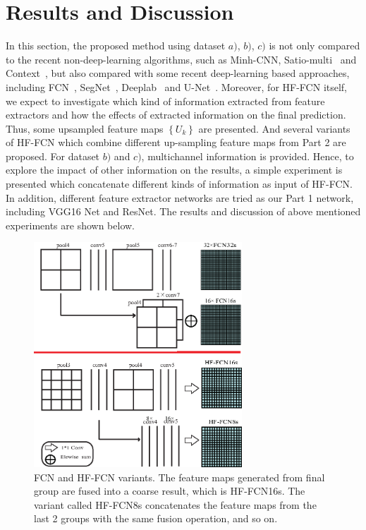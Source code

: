 \section{Results and Discussion}
\label{Sec:Res}

In this section, the proposed method using dataset ${a)}$, ${b)}$, ${c)}$ is not only compared to the recent non-deep-learning algorithms, such as Minh-CNN\cite{IEEEexample:mnih2013machine}, Satio-multi~\cite{IEEEexample:saito2016multiple} and Context~\cite{IEEEexample:audebert2017deep}, but also compared with some recent deep-learning based approaches, including FCN~\cite{IEEEexample:Long_2015_CVPR}, SegNet~\cite{IEEEexample:badrinarayanan2017segnet}, Deeplab~\cite{IEEEexample:chen2016deeplab} and U-Net~\cite{IEEEexample:ronneberger2015u}.
Moreover, for HF-FCN itself, we expect to investigate which kind of information extracted from feature extractors and how the effects of extracted information on the final prediction.
Thus, some upsampled feature maps ${\left\{U_k\right\}}$ are presented.
And several variants of HF-FCN which combine different up-sampling feature maps from Part 2 are proposed.
For dataset ${b)}$ and ${c)}$, multichannel information is provided.
Hence, to explore the impact of other information on the results, a simple experiment is presented which concatenate different kinds of information as input of HF-FCN.
In addition, different feature extractor networks are tried as our Part 1 network, including VGG16 Net and ResNet.
The results and discussion of above mentioned experiments are shown below.

\begin{figure}[t]
\vspace{-0.2cm}
\setlength{\abovecaptionskip}{-0cm}
\setlength{\belowcaptionskip}{-1cm} 
\begin{center}
\includegraphics[width=7.8cm]{Figures/vairants.eps}
\caption{FCN and HF-FCN variants. The feature maps generated from final group are fused into a coarse result, which is HF-FCN16s. The variant called HF-FCN8s concatenates the feature maps from the last 2 groups with the same fusion operation, and so on.}
\label{fig:Variants}
\end{center}
\end{figure}


